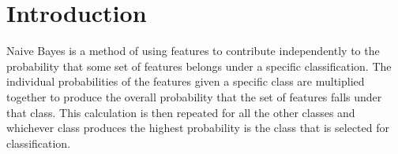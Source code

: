 \documentclass{article}
\begin{document}




\section{Introduction}
\quad Naive Bayes is a method of using features to contribute independently to the probability that some set of features belongs under a specific classification. The individual probabilities of the features given a specific class are multiplied together to produce the overall probability that the set of features falls under that class. This calculation is then repeated for all the other classes and whichever class produces the highest probability is the class that is selected for classification.
\end{document}
